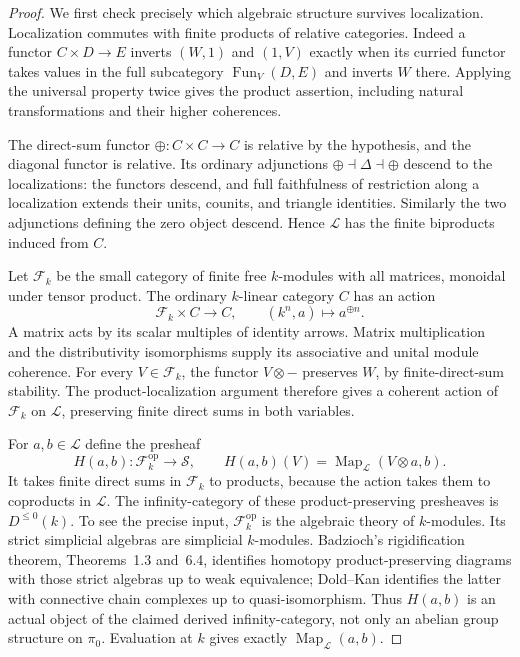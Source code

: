 \begin{proof}
We first check precisely which algebraic structure survives localization. Localization commutes with finite products of relative categories. Indeed a functor $C\times D\to E$ inverts $(W,1)$ and $(1,V)$ exactly when its curried functor takes values in the full subcategory $\operatorname{Fun}_V(D,E)$ and inverts $W$ there. Applying the universal property twice gives the product assertion, including natural transformations and their higher coherences.

The direct-sum functor $\oplus:C\times C\to C$ is relative by the hypothesis, and the diagonal functor is relative. Its ordinary adjunctions $\oplus\dashv\Delta\dashv\oplus$ descend to the localizations: the functors descend, and full faithfulness of restriction along a localization extends their units, counits, and triangle identities. Similarly the two adjunctions defining the zero object descend. Hence $\mathcal L$ has the finite biproducts induced from $C$.

Let $\mathcal F_k$ be the small category of finite free $k$-modules with all matrices, monoidal under tensor product. The ordinary $k$-linear category $C$ has an action
\[
 \mathcal F_k\times C\longrightarrow C,\qquad (k^n,a)\longmapsto a^{\oplus n}.
\]
A matrix acts by its scalar multiples of identity arrows. Matrix multiplication and the distributivity isomorphisms supply its associative and unital module coherence. For every $V\in\mathcal F_k$, the functor $V\otimes-$ preserves $W$, by finite-direct-sum stability. The product-localization argument therefore gives a coherent action of $\mathcal F_k$ on $\mathcal L$, preserving finite direct sums in both variables.

For $a,b\in\mathcal L$ define the presheaf
\[
 H(a,b):\mathcal F_k^{\mathrm{op}}\longrightarrow\mathcal S,
 \qquad H(a,b)(V)=\operatorname{Map}_{\mathcal L}(V\otimes a,b).
\]
It takes finite direct sums in $\mathcal F_k$ to products, because the action takes them to coproducts in $\mathcal L$. The infinity-category of these product-preserving presheaves is $D^{\leq0}(k)$. To see the precise input, $\mathcal F_k^{\mathrm{op}}$ is the algebraic theory of $k$-modules. Its strict simplicial algebras are simplicial $k$-modules. Badzioch's rigidification theorem, Theorems~1.3 and~6.4, identifies homotopy product-preserving diagrams with those strict algebras up to weak equivalence; Dold--Kan identifies the latter with connective chain complexes up to quasi-isomorphism. Thus $H(a,b)$ is an actual object of the claimed derived infinity-category, not only an abelian group structure on $\pi_0$. Evaluation at $k$ gives exactly $\operatorname{Map}_{\mathcal L}(a,b)$.


\end{proof}
